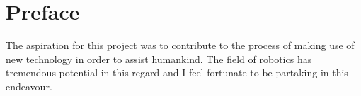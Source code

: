 \chapter{Preface}

The aspiration for this project was to contribute to the process of making use of new technology in order to assist humankind. The field of robotics has tremendous potential in this regard and I feel fortunate to be partaking in this endeavour.